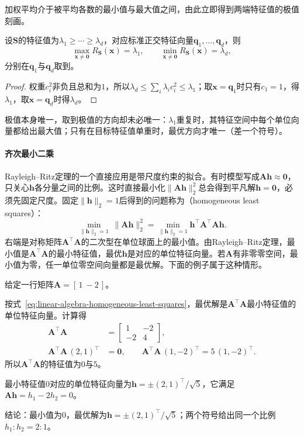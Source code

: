 加权平均介于被平均各数的最小值与最大值之间，由此立即得到两端特征值的极值刻画。
\begin{theorem}
\label{thm:matrix-analysis-rayleigh-ritz}
\label{eq:matrix-analysis-rayleigh-ritz}
设$\bm S$的特征值为$\lambda_1\geq\cdots\geq\lambda_d$，对应标准正交特征向量$\bm q_1,\ldots,\bm q_d$，则
\begin{equation*}
 \max_{\bm x\neq\bm0}R_{\bm S}(\bm x)=\lambda_1,\qquad
 \min_{\bm x\neq\bm0}R_{\bm S}(\bm x)=\lambda_d,
\end{equation*}
分别在$\bm q_1$与$\bm q_d$取到。
\end{theorem}
\begin{proof}
权重$c_i^2$非负且总和为$1$，所以$\lambda_d\leq\sum_i\lambda_ic_i^2\leq\lambda_1$；取$\bm x=\bm q_1$时只有$c_1=1$，得$\lambda_1$，取$\bm x=\bm q_d$时得$\lambda_d$。
\end{proof}
极值本身唯一，取到极值的方向却未必唯一：$\lambda_1$重复时，其特征空间中每个单位向量都给出最大值；只有在目标特征值单重时，最优方向才唯一（差一个符号）。

\paragraph{齐次最小二乘}
\label{sec:linear-algebra-homogeneous-estimation}

Rayleigh--Ritz定理的一个直接应用是带尺度约束的拟合。有时模型写成$\bm A\bm h\approx\bm0$，只关心$\bm h$各分量之间的比例。这时直接最小化$\lVert\bm A\bm h\rVert_2^2$总会得到平凡解$\bm h=\bm0$，必须先固定尺度。固定$\lVert\bm h\rVert_2=1$后得到的问题称为（homogeneous least squares）：
\begin{equation}
 \min_{\lVert\bm h\rVert_2=1}\ \lVert\bm A\bm h\rVert_2^2
 =\min_{\lVert\bm h\rVert_2=1}\bm h^\top\bm A^\top\bm A\bm h.
 \label{eq:linear-algebra-homogeneous-least-squares}
\end{equation}
右端是对称矩阵$\bm A^\top\bm A$的二次型在单位球面上的最小值。由Rayleigh--Ritz定理，最小值是$\bm A^\top\bm A$的最小特征值，最优$\bm h$是对应的单位特征向量。若$\bm A$有非零零空间，最小值为零，任一单位零空间向量都是最优解。下面的例子属于这种情形。
\begin{example}[一个方程的齐次最小二乘]
\label{ex:ls-homogeneous-least-squares-one-row}
给定一行矩阵$\bm A=[\,1\ -2\,]$。

按式~\eqref{eq:linear-algebra-homogeneous-least-squares}，最优解是$\bm A^\top\bm A$最小特征值的单位特征向量。计算得
\[
 \begin{aligned}
 \bm A^\top\bm A&=\begin{bmatrix}1&-2\\-2&4\end{bmatrix},\\
 \bm A^\top\bm A\,(2,1)^\top&=\bm0,\qquad
 \bm A^\top\bm A\,(1,-2)^\top=5\,(1,-2)^\top .
 \end{aligned}
\]
所以$\bm A^\top\bm A$的特征值为$0$与$5$。

最小特征值$0$对应的单位特征向量为$\bm h=\pm(2,1)^\top/\sqrt5$，它满足$\bm A\bm h=h_1-2h_2=0$。

结论：最小值为$0$，最优解为$\bm h=\pm(2,1)^\top/\sqrt5$；两个符号给出同一个比例$h_1:h_2=2:1$。
\end{example}

